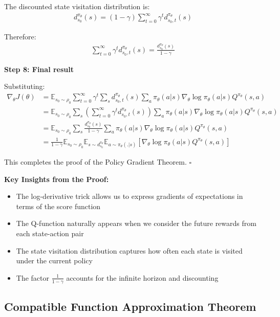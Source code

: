 The discounted state visitation distribution is:
\begin{align}
d^{\pi_\theta}_{s_0}(s) = (1-\gamma) \sum_{t=0}^{\infty} \gamma^t d^{\pi_\theta}_{s_0,t}(s)
\end{align}

Therefore:
\begin{align}
\sum_{t=0}^{\infty} \gamma^t d^{\pi_\theta}_{s_0,t}(s) = \frac{d^{\pi_\theta}_{s_0}(s)}{1-\gamma}
\end{align}

\textbf{Step 8: Final result}

Substituting:
\begin{align}
\nabla_\theta J(\theta) &= \mathbb{E}_{s_0 \sim \rho_0} \sum_{t=0}^{\infty} \gamma^t \sum_s d^{\pi_\theta}_{s_0,t}(s) \sum_a \pi_\theta(a|s) \nabla_\theta \log \pi_\theta(a|s) Q^{\pi_\theta}(s, a) \\
&= \mathbb{E}_{s_0 \sim \rho_0} \sum_s \left( \sum_{t=0}^{\infty} \gamma^t d^{\pi_\theta}_{s_0,t}(s) \right) \sum_a \pi_\theta(a|s) \nabla_\theta \log \pi_\theta(a|s) Q^{\pi_\theta}(s, a) \\
&= \mathbb{E}_{s_0 \sim \rho_0} \sum_s \frac{d^{\pi_\theta}_{s_0}(s)}{1-\gamma} \sum_a \pi_\theta(a|s) \nabla_\theta \log \pi_\theta(a|s) Q^{\pi_\theta}(s, a) \\
&= \frac{1}{1-\gamma} \mathbb{E}_{s_0 \sim \rho_0} \mathbb{E}_{s \sim d^{\pi_\theta}_{s_0}} \mathbb{E}_{a \sim \pi_\theta(.|s)} \left[ \nabla_\theta \log \pi_\theta(a|s) Q^{\pi_\theta}(s, a) \right]
\end{align}

This completes the proof of the Policy Gradient Theorem. $\square$

\textbf{Key Insights from the Proof:}
\begin{itemize}
    \item The log-derivative trick allows us to express gradients of expectations in terms of the score function
    \item The Q-function naturally appears when we consider the future rewards from each state-action pair
    \item The state visitation distribution captures how often each state is visited under the current policy
    \item The factor $\frac{1}{1-\gamma}$ accounts for the infinite horizon and discounting
\end{itemize}


\subsection{Compatible Function Approximation Theorem}

